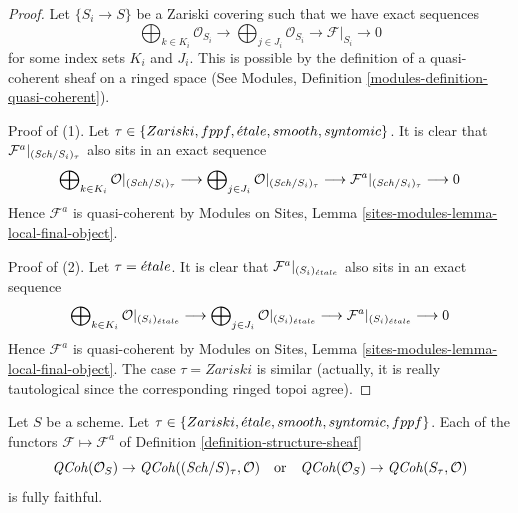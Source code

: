 \begin{proof}
Let $\{S_i \to S\}$ be a Zariski covering such that we have exact sequences
$$
\bigoplus\nolimits_{k \in K_i} \mathcal{O}_{S_i} \longrightarrow
\bigoplus\nolimits_{j \in J_i} \mathcal{O}_{S_i} \longrightarrow
\mathcal{F}|_{S_i} \longrightarrow 0
$$
for some index sets $K_i$ and $J_i$. This is possible by the definition
of a quasi-coherent sheaf on a ringed space
(See Modules, Definition \ref{modules-definition-quasi-coherent}).

\medskip\noindent
Proof of (1). Let $\tau \in \{Zariski, \linebreak[0] fppf, \linebreak[0]
\etale, \linebreak[0] smooth, \linebreak[0] syntomic\}$.
It is clear that $\mathcal{F}^a|_{(\mathit{Sch}/S_i)_\tau}$ also
sits in an exact sequence
$$
\bigoplus\nolimits_{k \in K_i} \mathcal{O}|_{(\mathit{Sch}/S_i)_\tau}
\longrightarrow
\bigoplus\nolimits_{j \in J_i} \mathcal{O}|_{(\mathit{Sch}/S_i)_\tau}
\longrightarrow
\mathcal{F}^a|_{(\mathit{Sch}/S_i)_\tau} \longrightarrow 0
$$
Hence $\mathcal{F}^a$ is quasi-coherent by Modules on Sites,
Lemma \ref{sites-modules-lemma-local-final-object}.

\medskip\noindent
Proof of (2). Let $\tau = {\acute{e}tale}$.
It is clear that $\mathcal{F}^a|_{(S_i)_{\acute{e}tale}}$ also sits
in an exact sequence
$$
\bigoplus\nolimits_{k \in K_i} \mathcal{O}|_{(S_i)_{\acute{e}tale}}
\longrightarrow
\bigoplus\nolimits_{j \in J_i} \mathcal{O}|_{(S_i)_{\acute{e}tale}}
\longrightarrow
\mathcal{F}^a|_{(S_i)_{\acute{e}tale}} \longrightarrow 0
$$
Hence $\mathcal{F}^a$ is quasi-coherent by Modules on Sites,
Lemma \ref{sites-modules-lemma-local-final-object}.
The case $\tau = Zariski$ is similar (actually, it is really
tautological since the corresponding ringed topoi agree).
\end{proof}

\begin{lemma}
\label{lemma-fully-faithful-associated}
Let $S$ be a scheme.
Let $\tau \in \{Zariski, \linebreak[0] \etale, \linebreak[0]
smooth, \linebreak[0] syntomic, \linebreak[0] fppf\}$.
Each of the functors $\mathcal{F} \mapsto \mathcal{F}^a$
of Definition \ref{definition-structure-sheaf}
$$
\mathit{QCoh}(\mathcal{O}_S) \to \mathit{QCoh}((\mathit{Sch}/S)_\tau, \mathcal{O})
\quad\text{or}\quad
\mathit{QCoh}(\mathcal{O}_S) \to \mathit{QCoh}(S_\tau, \mathcal{O})
$$
is fully faithful.
\end{lemma}

